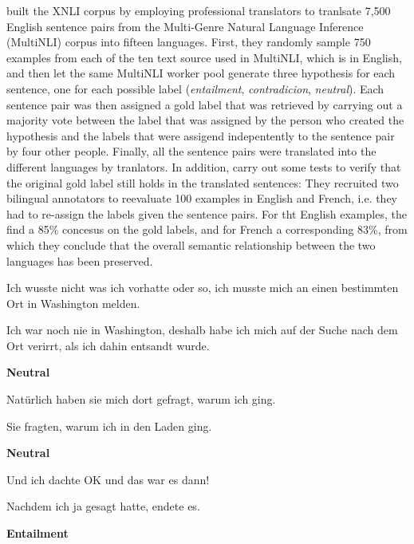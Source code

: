 \cite{conneau2018xnli} built the XNLI corpus by employing professional translators to tranlsate 
7,500 English sentence pairs from the Multi-Genre Natural Language Inference (MultiNLI) corpus 
\cite{williams2017broad} into fifteen languages.
First, they randomly sample 750 examples from each of the ten text source used in MultiNLI, which 
is in English, and then let the same MultiNLI worker pool generate three hypothesis for each 
sentence, one for each possible label (\emph{entailment}, \emph{contradicion}, \emph{neutral}).
Each sentence pair was then assigned a gold label that was retrieved by carrying out a majority 
vote between the label that was assigned by the person who created the hypothesis and the labels 
that were assigend indepentently to the sentence pair by four other people.
Finally, all the sentence pairs were translated into the different languages by tranlators.
In addition, \cite{conneau2018xnli} carry out some tests to verify that the original gold label 
still holds in the translated sentences:
They recruited two bilingual annotators to reevaluate 100 examples in English and French, i.e. 
they had to re-assign the labels given the sentence pairs.
For tht English examples, the find a 85\% concesus on the gold labels, and for French a 
corresponding 83\%, from which they conclude that the overall semantic relationship between the 
two languages has been preserved.


\begin{examples}
	\label{ex:xnli}
	\item Ich wusste nicht was ich vorhatte oder so, ich musste mich an einen bestimmten Ort in Washington melden.

        Ich war noch nie in Washington, deshalb habe ich mich auf der Suche nach dem Ort verirrt, als ich dahin entsandt wurde.

				\textbf{Neutral}
\end{examples}

\begin{examples}
	\item Natürlich haben sie mich dort gefragt, warum ich ging.

        Sie fragten, warum ich in den Laden ging.

				\textbf{Neutral}
\end{examples}

\begin{examples}
	\item Und ich dachte OK und das war es dann!

        Nachdem ich ja gesagt hatte, endete es.

				\textbf{Entailment}
\end{examples}


